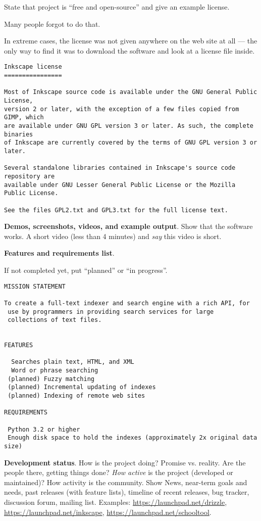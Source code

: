 \documentclass[landscape,30pt]{foils}
\begin{document}
State that project is ``free and open-source'' and give an example
license.

Many people forgot to do that.

In extreme cases, the license was not given anywhere on the web site
at all — the only way to find it was to download the software and look
at a license file inside.


{\tiny
\begin{verbatim}
Inkscape license
================

Most of Inkscape source code is available under the GNU General Public License,
version 2 or later, with the exception of a few files copied from GIMP, which
are available under GNU GPL version 3 or later. As such, the complete binaries
of Inkscape are currently covered by the terms of GNU GPL version 3 or later.

Several standalone libraries contained in Inkscape's source code repository are
available under GNU Lesser General Public License or the Mozilla Public License.

See the files GPL2.txt and GPL3.txt for the full license text.
\end{verbatim}
}

{\bf Demos, screenshots, videos, and example output}.  Show that the software works.  A short video (less than 4 minutes) and {\em say} this video is short.

{\bf Features and requirements list}.

If not completed yet, put ``planned'' or ``in progress''.
{\tiny
\begin{verbatim}
MISSION STATEMENT

To create a full-text indexer and search engine with a rich API, for
 use by programmers in providing search services for large
 collections of text files.


FEATURES

  Searches plain text, HTML, and XML
  Word or phrase searching
 (planned) Fuzzy matching
 (planned) Incremental updating of indexes
 (planned) Indexing of remote web sites

REQUIREMENTS

 Python 3.2 or higher
 Enough disk space to hold the indexes (approximately 2x original data size)

\end{verbatim}
}

{\bf Development status}.  How is the project doing?  Promise vs. reality.  Are the people there, getting things done? {\em How active} is the project (developed or maintained)?  How activity is the community.  Show News, near-term goals and needs, past releases (with feature lists), timeline of recent releases, bug tracker, discussion forum, mailing list. Examples: \url{https://launchpad.net/drizzle}, \url{https://launchpad.net/inkscape}, \url{https://launchpad.net/schooltool}.
\end{document}
